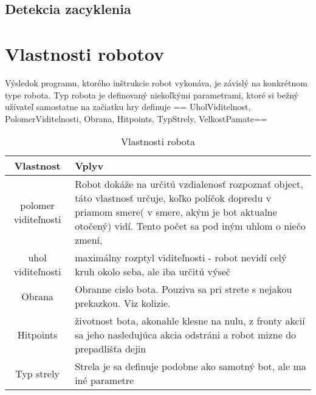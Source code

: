 \documentclass[a4paper,11pt,final]{report}
\begin{document}
\subsection{Detekcia zacyklenia}
\section{Vlastnosti robotov}
Výsledok programu, ktorého inštrukcie robot vykonáva, je závislý na konkrétnom type robota. Typ robota je definovaný niekoľkými parametrami, ktoré si bežný užívateľ samostatne na začiatku hry definuje == UholViditelnost, PolomerViditelnosti, Obrana, Hitpoints, TypStrely, VelkostPamate==\\
\begin{table}[ht]
\caption{Vlastnosti robota}   %
\centering                          %
\begin{tabular}{ | c | p{10cm} |}            %
\hline\hline                        %
Vlastnost & Vplyv \\   %
\hline                              %
polomer viditeľnosti & Robot dokáže na určitú vzdialenosť rozpoznať object, táto vlastnosť určuje, koľko políčok dopredu v priamom smere( v smere, akým je bot aktualne otočený) vidí. Tento počet sa pod iným uhlom o niečo zmení,\\\hline               %
uhol viditeľnosti & maximálny rozptyl viditeľnosti - robot nevidí celý kruh okolo seba, ale iba určitú výseč \\\hline
Obrana & Obranne cislo bota. Pouziva sa pri strete s nejakou prekazkou. Viz kolizie. \\\hline
Hitpoints  & životnost bota, akonahle klesne na nulu, z fronty akcií sa jeho nasledujúca akcia odstráni a robot mizne do prepadlišťa dejin\\\hline [1ex]         %
Typ strely & Strela je sa definuje podobne ako samotný bot, ale ma iné parametre\\\hline
\hline                              %
\end{tabular}
\label{table:vlastnosti}          %
\end{table}
\end{document}
